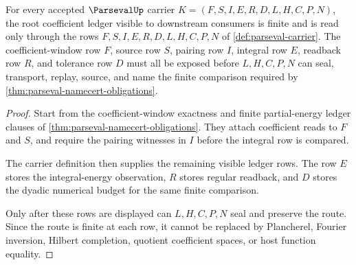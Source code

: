 \begin{theorem}
\label{thm:parseval-root-finite-coefficient-ledger}
For every accepted $\ParsevalUp$ carrier $K=(F,S,I,E,R,D,L,H,C,P,N)$, the root coefficient ledger visible to downstream consumers is finite and is read only through the rows $F,S,I,E,R,D,L,H,C,P,N$ of \autoref{def:parseval-carrier}. The coefficient-window row $F$, source row $S$, pairing row $I$, integral row $E$, readback row $R$, and tolerance row $D$ must all be exposed before $L,H,C,P,N$ can seal, transport, replay, source, and name the finite comparison required by \autoref{thm:parseval-namecert-obligations}.
\end{theorem}
\begin{proof}
Start from the coefficient-window exactness and finite partial-energy ledger clauses of \autoref{thm:parseval-namecert-obligations}. They attach coefficient reads to $F$ and $S$, and require the pairing witnesses in $I$ before the integral row is compared.

The carrier definition then supplies the remaining visible ledger rows. The row $E$ stores the integral-energy observation, $R$ stores regular readback, and $D$ stores the dyadic numerical budget for the same finite comparison.

Only after these rows are displayed can $L,H,C,P,N$ seal and preserve the route. Since the route is finite at each row, it cannot be replaced by Plancherel, Fourier inversion, Hilbert completion, quotient coefficient spaces, or host function equality.
\end{proof}

